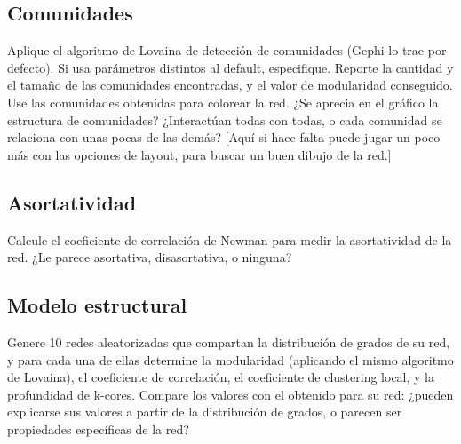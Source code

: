 \documentclass[12pt]{article}
\begin{document}
\subsection{Comunidades} Aplique el algoritmo de Lovaina de detección de comunidades (Gephi lo trae por defecto). Si usa parámetros distintos al default, especifique. Reporte la cantidad y el tamaño de las comunidades encontradas, y el valor de modularidad conseguido. Use las comunidades obtenidas para colorear la red. ¿Se aprecia en el gráfico la estructura de comunidades? ¿Interactúan todas con todas, o cada comunidad se relaciona con unas pocas de las demás? [Aquí si hace falta puede jugar un poco más con las opciones de layout, para buscar un buen dibujo de la red.]

\subsection{Asortatividad}
Calcule el coeficiente de correlación de Newman para medir la asortatividad de la red. ¿Le parece asortativa, disasortativa, o ninguna?

\subsection{Modelo estructural} Genere 10 redes aleatorizadas que compartan la distribución de grados de su red, y para cada una de ellas determine la modularidad (aplicando el mismo algoritmo de Lovaina), el coeficiente de correlación, el coeficiente de clustering local, y la profundidad de k-cores. Compare los valores con el obtenido para su red: ¿pueden explicarse sus valores a partir de la distribución de grados, o parecen ser propiedades específicas de la red?
\end{document}
